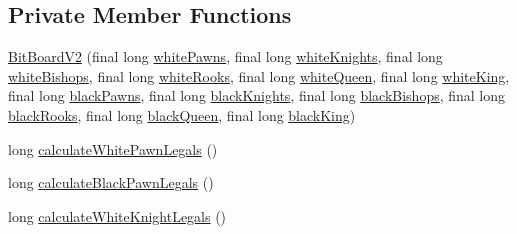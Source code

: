 \subsection*{Private Member Functions}
\begin{DoxyCompactItemize}
\item 
\mbox{\hyperlink{classcom_1_1chess_1_1engine_1_1bitboards_1_1_bit_board_v2_a2aee3d33c2ab506bd5b6524fde31f89d}{Bit\+Board\+V2}} (final long \mbox{\hyperlink{classcom_1_1chess_1_1engine_1_1bitboards_1_1_bit_board_v2_ad5983101a0b80c096b547a2f445d09f5}{white\+Pawns}}, final long \mbox{\hyperlink{classcom_1_1chess_1_1engine_1_1bitboards_1_1_bit_board_v2_a449c000d17727ff72fcbdc2083ff476d}{white\+Knights}}, final long \mbox{\hyperlink{classcom_1_1chess_1_1engine_1_1bitboards_1_1_bit_board_v2_ae9ca33072abb78ae0262c1319e73ce91}{white\+Bishops}}, final long \mbox{\hyperlink{classcom_1_1chess_1_1engine_1_1bitboards_1_1_bit_board_v2_a0b16c01a2b8087b426a60f029fa21303}{white\+Rooks}}, final long \mbox{\hyperlink{classcom_1_1chess_1_1engine_1_1bitboards_1_1_bit_board_v2_ac6681692d0198005c4c68066409abd18}{white\+Queen}}, final long \mbox{\hyperlink{classcom_1_1chess_1_1engine_1_1bitboards_1_1_bit_board_v2_afea0c72c3b1a59f370973b6e050ad363}{white\+King}}, final long \mbox{\hyperlink{classcom_1_1chess_1_1engine_1_1bitboards_1_1_bit_board_v2_ac8178e9ab0107d63ce3079e57720a21b}{black\+Pawns}}, final long \mbox{\hyperlink{classcom_1_1chess_1_1engine_1_1bitboards_1_1_bit_board_v2_af194bdea9665afd9420b1b8a7269e78e}{black\+Knights}}, final long \mbox{\hyperlink{classcom_1_1chess_1_1engine_1_1bitboards_1_1_bit_board_v2_a0e6cbbf04869cfb263d031d62dd42435}{black\+Bishops}}, final long \mbox{\hyperlink{classcom_1_1chess_1_1engine_1_1bitboards_1_1_bit_board_v2_ad2015a0c94fa85d4ae0921b246287bf1}{black\+Rooks}}, final long \mbox{\hyperlink{classcom_1_1chess_1_1engine_1_1bitboards_1_1_bit_board_v2_a27d9db3ea14076f4da6a5264f45db298}{black\+Queen}}, final long \mbox{\hyperlink{classcom_1_1chess_1_1engine_1_1bitboards_1_1_bit_board_v2_ae53e4cf3123c6ac4092fefe6b2f25619}{black\+King}})
\item 
long \mbox{\hyperlink{classcom_1_1chess_1_1engine_1_1bitboards_1_1_bit_board_v2_a865003e1eaccbe0c6a633af407a1b5a3}{calculate\+White\+Pawn\+Legals}} ()
\item 
long \mbox{\hyperlink{classcom_1_1chess_1_1engine_1_1bitboards_1_1_bit_board_v2_a824c2bc14a4206d4633086f81d90fd37}{calculate\+Black\+Pawn\+Legals}} ()
\item 
long \mbox{\hyperlink{classcom_1_1chess_1_1engine_1_1bitboards_1_1_bit_board_v2_a85087bc000a15e9f214d133c91cc7056}{calculate\+White\+Knight\+Legals}} ()

\end{DoxyCompactItemize}
